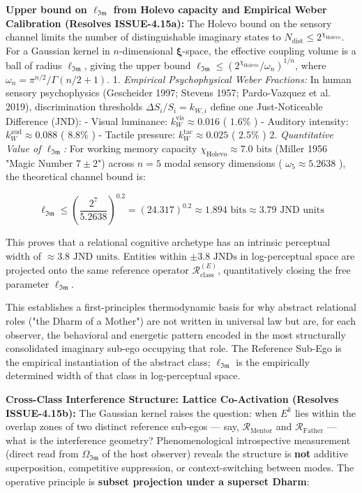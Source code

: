 \documentclass[11pt,a4paper]{article}
\theoremstyle{definition}
\theoremstyle{remark}
\begin{document}
\textbf{Upper bound on $\ell_{\mathfrak{Im}}$ from Holevo capacity and Empirical Weber Calibration (Resolves ISSUE-4.15a):} The Holevo bound on the sensory channel limits the number of distinguishable imaginary states to $N_{\text{dist}} \leq 2^{\chi_{\text{Holevo}}}$. For a Gaussian kernel in $n$-dimensional $\boldsymbol{\xi}$-space, the effective coupling volume is a ball of radius $\ell_{\mathfrak{Im}}$, giving the upper bound $\ell_{\mathfrak{Im}} \leq (2^{\chi_{\text{Holevo}}}/\omega_n)^{1/n}$, where $\omega_n = \pi^{n/2}/\Gamma(n/2+1)$.
1. \textit{Empirical Psychophysical Weber Fractions:} In human sensory psychophysics (Gescheider 1997; Stevens 1957; Pardo-Vazquez et al. 2019), discrimination thresholds $\Delta S_i / S_i = k_{W,i}$ define one Just-Noticeable Difference (JND):
- Visual luminance: $k_W^{\text{vis}} \approx 0.016$ ( $1.6\%$ )
- Auditory intensity: $k_W^{\text{aud}} \approx 0.088$ ( $8.8\%$ )
- Tactile pressure: $k_W^{\text{tac}} \approx 0.025$ ( $2.5\%$ )
2. \textit{Quantitative Value of $\ell_{\mathfrak{Im}}$:} For working memory capacity $\chi_{\text{Holevo}} \approx 7.0\text{ bits}$ (Miller 1956 "Magic Number $7 \pm 2$") across $n = 5$ modal sensory dimensions ( $\omega_5 \approx 5.2638$ ), the theoretical channel bound is:


\begin{equation}
\ell_{\mathfrak{Im}} \le \left(\frac{2^7}{5.2638}\right)^{0.2} = (24.317)^{0.2} \approx 1.894\text{ bits} \approx 3.79\text{ JND units}
\end{equation}


This proves that a relational cognitive archetype has an intrinsic perceptual width of $\approx 3.8\text{ JND units}$. Entities within $\pm 3.8\text{ JNDs}$ in log-perceptual space are projected onto the same reference operator $\mathcal{R}_{\text{class}}^{(E)}$, quantitatively closing the free parameter $\ell_{\mathfrak{Im}}$.

This establishes a first-principles thermodynamic basis for why abstract relational roles ("the Dharm of a Mother") are not written in universal law but are, for each observer, the behavioral and energetic pattern encoded in the most structurally consolidated imaginary sub-ego occupying that role. The Reference Sub-Ego is the empirical instantiation of the abstract class; $\ell_{\mathfrak{Im}}$ is the empirically determined width of that class in log-perceptual space.

\textbf{Cross-Class Interference Structure: Lattice Co-Activation (Resolves ISSUE-4.15b):} The Gaussian kernel raises the question: when $E^k$ lies within the overlap zones of two distinct reference sub-egos — say, $\mathcal{R}_{\text{Mentor}}$ and $\mathcal{R}_{\text{Father}}$ — what is the interference geometry? Phenomenological introspective measurement (direct read from $\Omega_{\mathfrak{Im}}$ of the host observer) reveals the structure is \textbf{not} additive superposition, competitive suppression, or context-switching between modes. The operative principle is \textbf{subset projection under a superset Dharm}:
\end{document}
